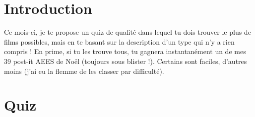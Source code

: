 \hypertarget{introduction}{%
\section{Introduction}\label{introduction}}

Ce mois-ci, je te propose un quiz de qualité dans lequel tu dois trouver
le plus de films possibles, mais en te basant sur la description d'un
type qui n'y a rien compris ! En prime, si tu les trouve tous, tu
gagnera instantanément un de mes 39 post-it AEES de Noël (toujours sous
blister !). Certains sont faciles, d'autres moins (j'ai eu la flemme de
les classer par difficulté).

\hypertarget{quiz}{%
\section{Quiz}\label{quiz}}

